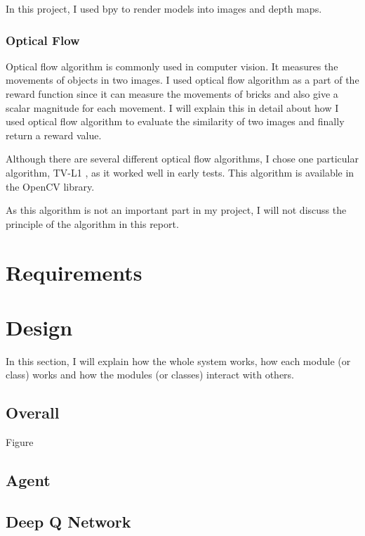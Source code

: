 \documentclass[a4paper]{article}
\begin{document}
                In this project, I used bpy to render models into images and depth maps.
            
            \subsubsection{Optical Flow}
                Optical flow algorithm is commonly used in computer vision. It measures the movements of objects in two images. I used optical flow algorithm as a part of the reward function since it can measure the movements of bricks and also give a scalar magnitude for each movement. I will explain this in detail about how I used optical flow algorithm to evaluate the similarity of two images and finally return a reward value.
                
                Although there are several different optical flow algorithms, I chose one particular algorithm, TV-L1 \cite{tvl1}, as it worked well in early tests. This algorithm is available in the OpenCV library.
                
                As this algorithm is not an important part in my project, I will not discuss the principle of the algorithm in this report.
            
    \section{Requirements}
        
    \section{Design}
    
        In this section, I will explain how the whole system works, how each module (or class) works and how the modules (or classes) interact with others.
    
        \subsection{Overall}
        
            Figure~
            
            
        
        
        \subsection{Agent}
        
        
        \subsection{Deep Q Network}
        
\end{document}
